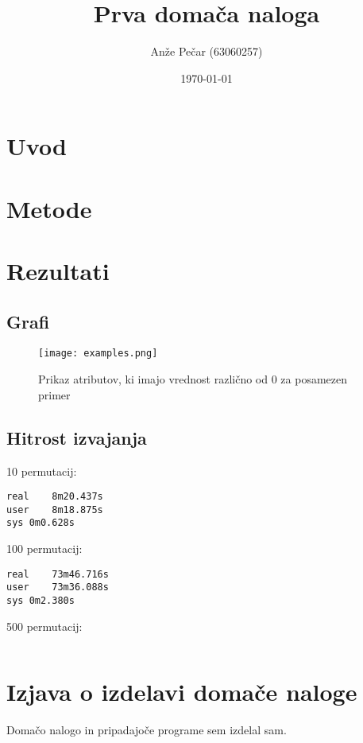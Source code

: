 \documentclass[a4paper,11pt]{article}
\title{Prva domača naloga}
\author{Anže Pečar (63060257)}
\date{\today}
\begin{document}
\maketitle

\section{Uvod}
\section{Metode}
\section{Rezultati}
\subsection{Grafi}
\begin{figure}[H]
\begin{center}
\texttt{[image: examples.png]}
\caption{Prikaz atributov, ki imajo vrednost različno od 0 za posamezen primer}
\label{primeri}
\end{center}
\end{figure}
\subsection{Hitrost izvajanja}
10 permutacij:
\begin{verbatim}
real	8m20.437s
user	8m18.875s
sys	0m0.628s
\end{verbatim}
100 permutacij:
\begin{verbatim}
real	73m46.716s
user	73m36.088s
sys	0m2.380s

\end{verbatim}
500 permutacij:
\begin{verbatim}

\end{verbatim}


\section{Izjava o izdelavi domače naloge}
Domačo nalogo in pripadajoče programe sem izdelal sam.
\end{document}
